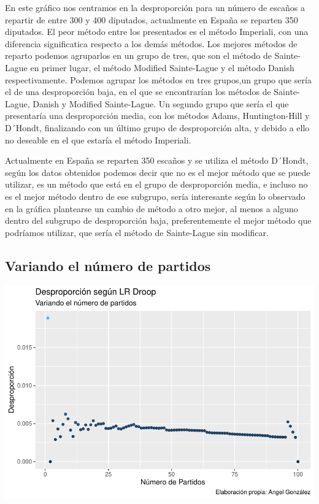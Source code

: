 \documentclass[12pt,a4paper,]{book}
\numberwithin{dummy}{section}
\theoremstyle{ocrenumbox}
\theoremstyle{blacknumex}
\theoremstyle{blacknumbox}
\theoremstyle{ocrenum}
\theoremstyle{ocrenum}
\begin{document}
En este gráfico nos centramos en la desproporción para un número de
escaños a repartir de entre 300 y 400 diputados, actualmente en España
se reparten 350 diputados. El peor método entre los presentados es el
método Imperiali, con una diferencia significatica respecto a los demás
métodos. Los mejores métodos de reparto podemos agruparlos en un grupo
de tres, que son el método de Sainte-Lague en primer lugar, el método
Modified Sainte-Lague y el método Danish respectivamente. Podemos
agrupar los métodos en tres grupos,un grupo que sería el de una
desproporción baja, en el que se encontrarían los métodos de
Sainte-Lague, Danish y Modified Sainte-Lague. Un segundo grupo que sería
el que presentaría una desproporción media, con los métodos Adams,
Huntington-Hill y D´Hondt, finalizando con un último grupo de
desproporción alta, y debido a ello no deseable en el que estaría el
método Imperiali.

Actualmente en España se reparten 350 escaños y se utiliza el método
D´Hondt, según los datos obtenidos podemos decir que no es el mejor
método que se puede utilizar, es un método que está en el grupo de
desproporción media, e incluso no es el mejor método dentro de ese
subgrupo, sería interesante según lo observado en la gráfica plantearse
un cambio de método a otro mejor, al menos a alguno dentro del subgrupo
de desproporción baja, preferentemente el mejor método que podríamos
utilizar, que sería el método de Sainte-Lague sin modificar.

\hypertarget{variando-el-nuxfamero-de-partidos}{%
\subsection{Variando el número de
partidos}\label{variando-el-nuxfamero-de-partidos}}

\begin{center}\includegraphics[width=0.95\linewidth]{figurasR/unnamed-chunk-47-1} \end{center}
\end{document}
